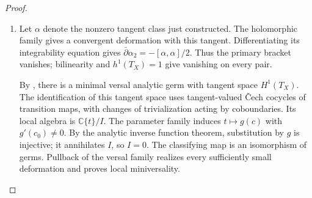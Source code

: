 \begin{proof}
\begin{enumerate}[label=\arabic*.,leftmargin=*]
\item Let $\alpha$ denote the nonzero tangent class just constructed.
The holomorphic family gives a convergent deformation with this tangent.
Differentiating its integrability equation gives
$\bar\partial\alpha_2=-[\alpha,\alpha]/2$. Thus the primary
bracket vanishes; bilinearity and $h^1(T_X)=1$ give vanishing on
every pair.

By \cite[\S VII.8, principal theorem, pp.~598--599;
\S VIII.1, Theorem~1 and its corollary, p.~600]{Douady1974},
there is a minimal versal analytic germ with tangent space $H^1(T_X)$. The identification of this tangent space
uses tangent-valued \v Cech cocycles of transition maps, with changes
of trivialization acting by coboundaries. Its local algebra is
$\mathbb C\{t\}/I$. The parameter family induces
$t\mapsto g(c)$ with $g'(c_0)\ne0$. By the analytic inverse
function theorem, substitution by $g$ is injective; it annihilates
$I$, so $I=0$. The classifying map is an isomorphism of germs.
Pullback of the versal family realizes every sufficiently small
deformation and proves local miniversality.


\end{enumerate}
\end{proof}
